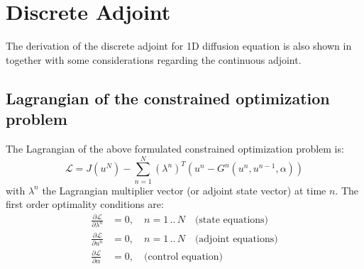 \section{Discrete Adjoint}
The derivation of the discrete adjoint for 1D diffusion equation is also shown in \cite{li2004adjoint} together with some considerations regarding the continuous adjoint.
\subsection{Lagrangian of the constrained optimization problem}
The Lagrangian of the above formulated constrained optimization problem is:
\begin{equation}
\mathcal{L} = J\left( u^N \right) - \sum_{n=1}^{N} \left( \lambda^n \right)^T\left( u^n - G^n \left( u^n, u^{n-1}, \alpha \right) \right)
\end{equation}
with $\lambda^n$ the Lagrangian multiplier vector (or adjoint state vector) at time $n$. The first order optimality conditions are:
\begin{align}
\frac{\partial \mathcal{L}}{\partial \lambda^n} &= 0,\quad n= 1\,..\,N\quad\text{(state equations)}\\
\frac{\partial \mathcal{L}}{\partial u^n} &= 0,\quad n= 1\,..\,N\quad\text{(adjoint equations)}\\
\frac{\partial \mathcal{L}}{\partial \alpha} &= 0,\quad\text{(control equation)}\\
\end{align}
